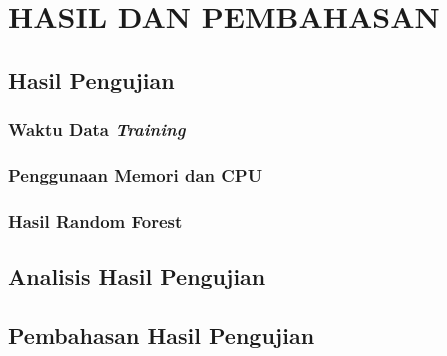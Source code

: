 \documentclass[ugmtesis]{ugmtesis}
\begin{document}



\chapter{HASIL DAN PEMBAHASAN}
\label{hasil dan pembahasan}

	\section{Hasil Pengujian}
	\label{hasil pengujian}
	

		\subsection{Waktu Data \textit{Training}}
		\label{waktu data training}
		

		\subsection{Penggunaan Memori dan CPU}
		\label{penggunaan memori dan cpu}
		

		\subsection{Hasil Random Forest}
		\label{performa random forest}
		

	\section{Analisis Hasil Pengujian}
	\label{analisis hasil pengujian}
	

	\section{Pembahasan Hasil Pengujian}
	\label{pembahasan hasil pengujian}
	


\end{document}
